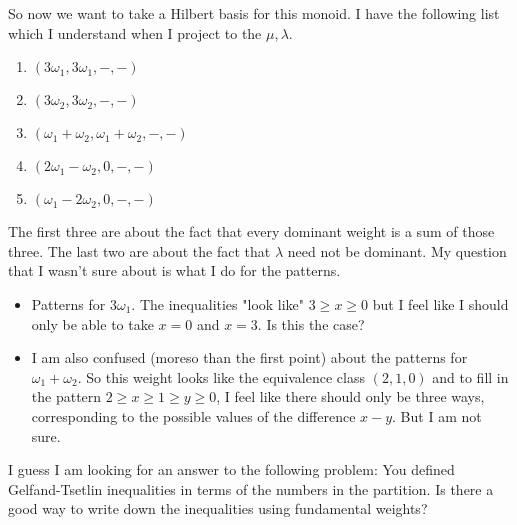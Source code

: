 \documentclass[12pt]{article}
\begin{document}
So now we want to take a Hilbert basis for this monoid. I have the following list which I understand when I project to the $\mu,\lambda$. \begin{enumerate}
    \item $(3\omega_1, 3\omega_1, -, -)$
    \item $(3\omega_2, 3\omega_2, -, -)$
    \item $(\omega_1 + \omega_2, \omega_1 + \omega_2, -, -)$
    \item $(2\omega_1 - \omega_2, 0, -, -)$
    \item $(\omega_1 - 2\omega_2, 0, -, -)$
\end{enumerate}
The first three are about the fact that every dominant weight is a sum of those three. The last two are about the fact that $\lambda$ need not be dominant. My question that I wasn't sure about is what I do for the patterns.

\begin{itemize}
    \item Patterns for $3\omega_1$. The inequalities "look like" $3 \geq x \geq 0$ but I feel like I should only be able to take $x = 0$ and $x=3$. Is this the case?
    \item I am also confused (moreso than the first point) about the patterns for $\omega_1 + \omega_2$. So this weight looks like the equivalence class $(2,1,0)$ and to fill in the pattern $2\geq x \geq 1 \geq y \geq 0$, I feel like there should only be three ways, corresponding to the possible values of the difference $x-y$. But I am not sure.
\end{itemize}
I guess I am looking for an answer to the following problem: You defined Gelfand-Tsetlin inequalities in terms of the numbers in the partition. Is there a good way to write down the inequalities using fundamental weights? 
\end{document}
